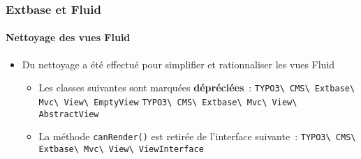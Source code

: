 %

\begin{frame}[fragile]
	\frametitle{Extbase et Fluid}
	\framesubtitle{Nettoyage des vues Fluid}


	\begin{itemize}
		\item Du nettoyage a été effectué pour simplifier et rationnaliser les vues Fluid
			\begin{itemize}
				\item Les classes suivantes sont marquées \textbf{dépréciées}~:\newline
					\small\texttt{TYPO3\textbackslash
						CMS\textbackslash
						Extbase\textbackslash
						Mvc\textbackslash
						View\textbackslash
						EmptyView}\normalsize\newline
					\small\texttt{TYPO3\textbackslash
						CMS\textbackslash
						Extbase\textbackslash
						Mvc\textbackslash
						View\textbackslash
						AbstractView}\normalsize
			\end{itemize}

			\begin{itemize}
				\item La méthode \texttt{canRender()} est retirée de l'interface suivante~:\newline
					\small\texttt{TYPO3\textbackslash
						CMS\textbackslash
						Extbase\textbackslash
						Mvc\textbackslash
						View\textbackslash
						ViewInterface}\normalsize
			\end{itemize}

	\end{itemize}

\end{frame}

